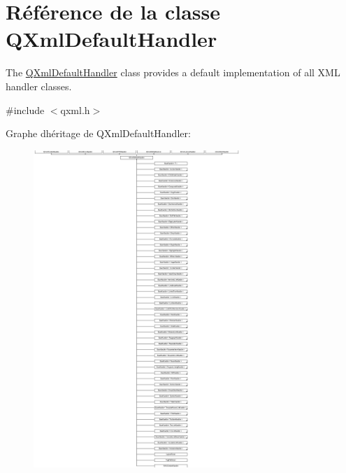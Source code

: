\hypertarget{class_q_xml_default_handler}{}\section{Référence de la classe Q\+Xml\+Default\+Handler}
\label{class_q_xml_default_handler}


The \hyperlink{class_q_xml_default_handler}{Q\+Xml\+Default\+Handler} class provides a default implementation of all X\+M\+L handler classes.  




{\ttfamily \#include $<$qxml.\+h$>$}

Graphe d\textquotesingle{}héritage de Q\+Xml\+Default\+Handler\+:\begin{figure}[H]
\begin{center}
\leavevmode
\includegraphics[height=12.000000cm]{class_q_xml_default_handler}
\end{center}
\end{figure}
